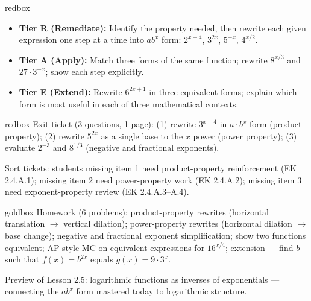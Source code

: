 \documentclass[10pt]{article}
\begin{document}
\begin{skillbox}{redbox}
\begin{itemize}[leftmargin=1.2em,itemsep=2pt,topsep=0pt]
  \item \textbf{Tier R (Remediate):} Identify the property needed, then rewrite each given
        expression one step at a time into $ab^x$ form: $2^{x+4}$, $3^{2x}$, $5^{-x}$, $4^{x/2}$.
  \item \textbf{Tier A (Apply):} Match three forms of the same function; rewrite $8^{x/3}$
        and $27 \cdot 3^{-x}$; show each step explicitly.
  \item \textbf{Tier E (Extend):} Rewrite $6^{2x+1}$ in three equivalent forms; explain which
        form is most useful in each of three mathematical contexts.
\end{itemize}
\end{skillbox}

\begin{skillbox}{redbox}
Exit ticket (3 questions, 1 page): (1) rewrite $3^{x+4}$ in $a \cdot b^x$ form (product
property); (2) rewrite $5^{2x}$ as a single base to the $x$ power (power property);
(3) evaluate $2^{-3}$ and $8^{1/3}$ (negative and fractional exponents).

Sort tickets: students missing item 1 need product-property reinforcement (EK 2.4.A.1);
missing item 2 need power-property work (EK 2.4.A.2); missing item 3 need exponent-property
review (EK 2.4.A.3--A.4).
\end{skillbox}

\begin{skillbox}{goldbox}
Homework (6 problems): product-property rewrites (horizontal translation $\to$ vertical
dilation); power-property rewrites (horizontal dilation $\to$ base change); negative and
fractional exponent simplification; show two functions equivalent; AP-style MC on equivalent
expressions for $16^{x/4}$; extension --- find $b$ such that $f(x) = b^{2x}$ equals
$g(x) = 9 \cdot 3^x$.

Preview of Lesson 2.5: logarithmic functions as inverses of exponentials --- connecting the
$ab^x$ form mastered today to logarithmic structure.
\end{skillbox}
\end{document}

